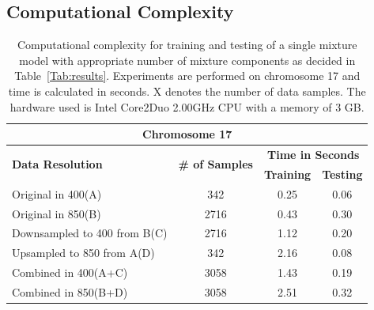  \subsection{Computational Complexity}
 \label{ss:compcomplex}
 \begin{table}[h!]
  \centering
  \begin{tabular}{|l|c|c|c|}
    \hline
%     
    \multicolumn{4}{|c|}{\textbf{Chromosome 17}}\\   \hline 
    \multirow{2}{*}{\textbf{Data Resolution}} & \multirow{2}{*}{\textbf{\# of Samples}} &  \multicolumn{2}{|c|}{\textbf{Time in Seconds}} \\ \cline{3-4}   
				&		&\textbf{Training} & \textbf{Testing} \\ \hline   
    Original in 400(A)		&	342	& 0.25	  & 0.06	\\ \hline
    Original in 850(B)		&	2716    & 0.43    & 0.30	\\ \hline
    Downsampled to 400 from B(C)&	2716    & 1.12	  & 0.20	\\ \hline
    Upsampled to 850 from A(D)	&	342	& 2.16	  & 0.08	\\ \hline
    Combined in 400(A+C)	&	3058    & 1.43    & 0.19	\\ \hline
    Combined in 850(B+D)	&	3058    & 2.51    & 0.32	\\ \hline  
  \end{tabular}
  \caption[Computational complexity of mixture models]{Computational complexity for training and testing of a single mixture model with appropriate number of mixture components as decided in Table~\ref{Tab:results}. Experiments are performed on chromosome 17 and time is calculated in seconds. X denotes the number of data samples. The hardware used is Intel Core2Duo 2.00GHz CPU with a memory of 3 GB.}\label{Tab:computation}
\end{table}

